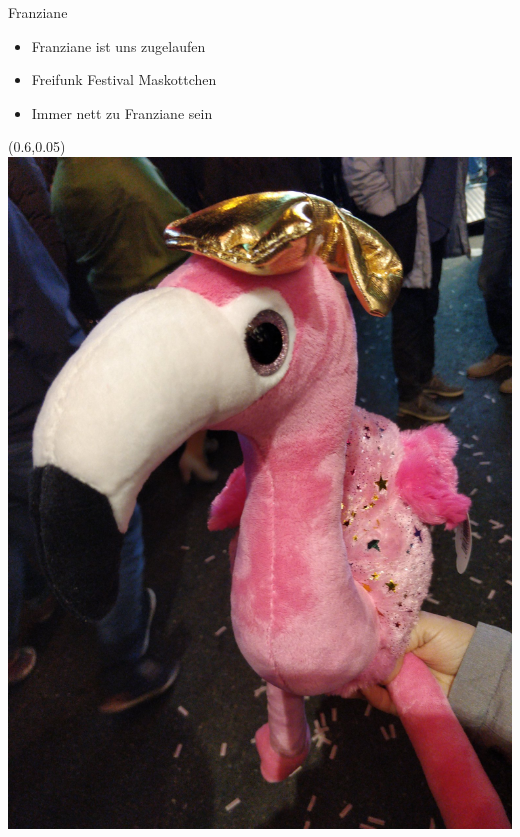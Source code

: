 \begin{frame}{Franziane}
    \begin{itemize}
        \item Franziane ist uns zugelaufen
        \item Freifunk Festival Maskottchen
        \item Immer nett zu Franziane sein
    \end{itemize}
    \begin{textblock*}{0.4\textwidth}(0.6\textwidth,0.05\textheight)
        \includegraphics[keepaspectratio,height=0.9\textheight]{img/franziane}
    \end{textblock*}
\end{frame}

